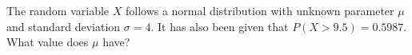 The random variable $X$ follows a normal distribution with unknown parameter $\mu$ and standard deviation $\sigma = 4$.
It has also been given that $P(X > 9.5) = 0.5987$.
What value does $\mu$ have?